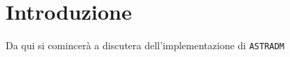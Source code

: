 \chapter{Introduzione}
Da qui si comincerà a discutera dell'implementazione di
\texttt{ASTRADM}




